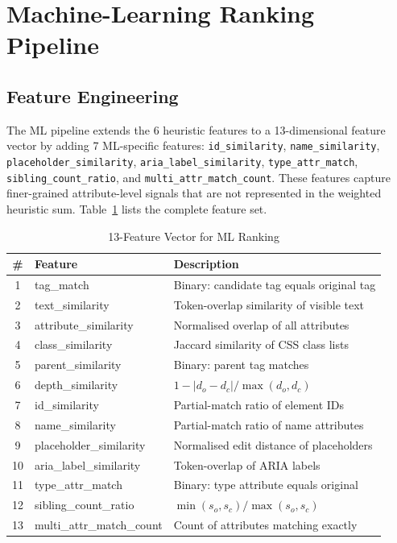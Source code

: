 \documentclass[12pt]{article}
\begin{document}
\section{Machine-Learning Ranking Pipeline}
\label{sec:ml}

\subsection{Feature Engineering}

The ML pipeline extends the 6 heuristic features to a 13-dimensional feature vector by adding 7 ML-specific features: \texttt{id\_similarity}, \texttt{name\_similarity}, \texttt{placeholder\_similarity}, \texttt{aria\_label\_similarity}, \texttt{type\_attr\_match}, \texttt{sibling\_count\_ratio}, and \texttt{multi\_attr\_match\_count}. These features capture finer-grained attribute-level signals that are not represented in the weighted heuristic sum. Table~\ref{tab:features} lists the complete feature set.

\begin{table}[H]
\centering
\caption{13-Feature Vector for ML Ranking}
\label{tab:features}
\begin{tabular}{clp{7cm}}
\toprule
\# & Feature & Description \\
\midrule
1 & tag\_match & Binary: candidate tag equals original tag \\
2 & text\_similarity & Token-overlap similarity of visible text \\
3 & attribute\_similarity & Normalised overlap of all attributes \\
4 & class\_similarity & Jaccard similarity of CSS class lists \\
5 & parent\_similarity & Binary: parent tag matches \\
6 & depth\_similarity & $1 - |d_o - d_c| / \max(d_o, d_c)$ \\
\midrule
7 & id\_similarity & Partial-match ratio of element IDs \\
8 & name\_similarity & Partial-match ratio of name attributes \\
9 & placeholder\_similarity & Normalised edit distance of placeholders \\
10 & aria\_label\_similarity & Token-overlap of ARIA labels \\
11 & type\_attr\_match & Binary: type attribute equals original \\
12 & sibling\_count\_ratio & $\min(s_o, s_c) / \max(s_o, s_c)$ \\
13 & multi\_attr\_match\_count & Count of attributes matching exactly \\
\bottomrule
\end{tabular}
\end{table}
\end{document}
